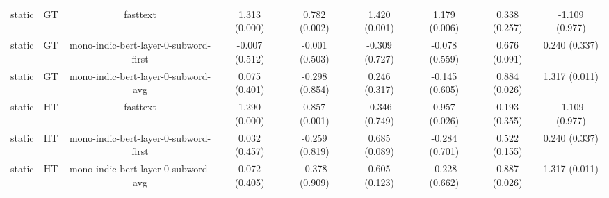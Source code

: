 \begin{sidewaystable}[htb]
\begin{tabular}{@{}ccccccccc@{}}
        static & GT & fasttext & 1.313 (0.000) & 0.782 (0.002) & 1.420 (0.001) & 1.179 (0.006) & 0.338 (0.257) & -1.109 (0.977) \\
        static & GT & mono-indic-bert-layer-0-subword-first & -0.007 (0.512) & -0.001 (0.503) & -0.309 (0.727) & -0.078 (0.559) & 0.676 (0.091) & 0.240 (0.337) \\
        static & GT & mono-indic-bert-layer-0-subword-avg & 0.075 (0.401) & -0.298 (0.854) & 0.246 (0.317) & -0.145 (0.605) & 0.884 (0.026) & 1.317 (0.011) \\
        static & HT & fasttext & 1.290 (0.000) & 0.857 (0.001) & -0.346 (0.749) & 0.957 (0.026) & 0.193 (0.355) & -1.109 (0.977) \\
        static & HT & mono-indic-bert-layer-0-subword-first & 0.032 (0.457) & -0.259 (0.819) & 0.685 (0.089) & -0.284 (0.701) & 0.522 (0.155) & 0.240 (0.337) \\
        static & HT & mono-indic-bert-layer-0-subword-avg & 0.072 (0.405) & -0.378 (0.909) & 0.605 (0.123) & -0.228 (0.662) & 0.887 (0.026) & 1.317 (0.011) \\
        \bottomrule
    \end{tabular}
\end{sidewaystable}